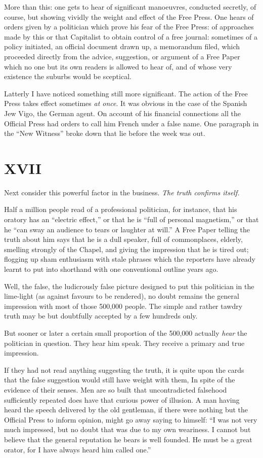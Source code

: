 \documentclass{book}
\begin{document}
More than this: one gets to hear of significant manoeuvres, conducted secretly, of course, but showing vividly the weight and effect of the Free Press. One hears of orders given by a politician which prove his fear of the Free Press: of approaches made by this or that Capitalist to obtain control of a free journal: sometimes of a policy initiated, an official document drawn up, a memorandum filed, which proceeded directly from the advice, suggestion, or argument of a Free Paper which no one but its own readers is allowed to hear of, and of whose very existence the suburbs would be sceptical.

Latterly I have noticed something still more significant. The action of the Free Press takes effect sometimes \emph{at once}. It was obvious in the case of the Spanish Jew Vigo, the German agent. On account of his financial connections all the Official Press had orders to call him French under a false name. One paragraph in the “New Witness” broke down that lie before the week was out.

\chapter*{XVII}
\label{chapter-18}
Next consider this powerful factor in the business. \emph{The truth confirms itself.}

Half a million people read of a professional politician, for instance, that his oratory has an “electric effect,” or that he is “full of personal magnetism,” or that he “can sway an audience to tears or laughter at will.” A Free Paper telling the truth about him says that he is a dull speaker, full of commonplaces, elderly, smelling strongly of the Chapel, and giving the impression that he is tired out; flogging up sham enthusiasm with stale phrases which the reporters have already learnt to put into shorthand with one conventional outline years ago.\footnotemark[1]

Well, the false, the ludicrously false picture designed to put this politician in the lime-light (as against favours to be rendered), no doubt remains the general impression with most of those 500,000 people. The simple and rather tawdry truth may be but doubtfully accepted by a few hundreds only.

But sooner or later a certain small proportion of the 500,000 actually \emph{hear} the politician in question. They hear him speak. They receive a primary and true impression.

If they had not read anything suggesting the truth, it is quite upon the cards that the false suggestion would still have weight with them, In spite of the evidence of their senses. Men are so built that uncontradicted falsehood sufficiently repeated does have that curious power of illusion. A man having heard the speech delivered by the old gentleman, if there were nothing but the Official Press to inform opinion, might go away saying to himself: “I was not very much impressed, but no doubt that was due to my own weariness. I cannot but believe that the general reputation he bears is well founded. He must be a great orator, for I have always heard him called one.”
\end{document}
